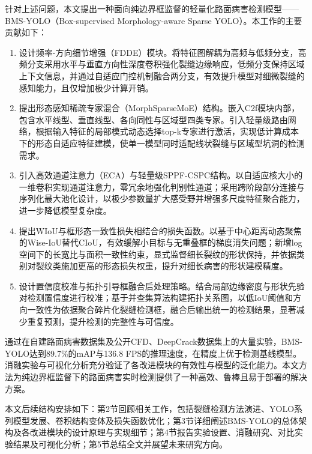 \documentclass[twocolumn]{sn-jnl}
\begin{document}
	针对上述问题，本文提出一种面向纯边界框监督的轻量化路面病害检测模型——BMS-YOLO（Box-supervised Morphology-aware Sparse YOLO）。本工作的主要贡献如下：

	\begin{enumerate}
		\item 设计频率-方向细节增强（FDDE）模块。将特征图解耦为高频与低频分支，高频分支采用水平与垂直方向性深度卷积强化裂缝边缘响应，低频分支保持区域上下文信息，并通过自适应门控机制融合两分支，有效提升模型对细微裂缝的感知能力，且仅增加极少计算开销。

		\item 提出形态感知稀疏专家混合（MorphSparseMoE）结构。嵌入C2f模块内部，包含水平线型、垂直线型、各向同性与区域型四类专家。引入轻量级路由网络，根据输入特征的局部模式动态选择top-k专家进行激活，实现低计算成本下的形态自适应特征建模，使单一模型同时适配线状裂缝与区域型坑洞的检测需求。

		\item 引入高效通道注意力（ECA）与轻量级SPPF-CSPC结构。以自适应核大小的一维卷积实现通道注意力，零冗余地强化判别性通道；采用跨阶段部分连接与序列化最大池化设计，以极少参数量扩大感受野并增强多尺度特征聚合能力，进一步降低模型复杂度。

		\item 提出WIoU与框形态一致性损失相结合的损失函数。以基于中心距离动态聚焦的Wise-IoU替代CIoU，有效缓解小目标与无重叠框的梯度消失问题；新增log空间下的长宽比与面积一致性约束，显式监督细长裂纹的形状保持，并依据类别对裂纹类施加更高的形态损失权重，提升对细长病害的形状建模精度。

		\item 设计置信度校准与拓扑引导框融合后处理策略。结合局部边缘密度与形状先验对检测置信度进行校准；基于并查集算法构建拓扑关系图，以低IoU阈值和方向一致性为依据聚合碎片化裂缝检测框，融合后输出统一的检测结果，显著减少重复预测，提升检测的完整性与可信度。
	\end{enumerate}

	通过在自建路面病害数据集及公开CFD、DeepCrack数据集上的大量实验，BMS-YOLO达到89.7\%的mAP与136.8 FPS的推理速度，在精度上优于检测基线模型。消融实验与可视化分析充分验证了各改进模块的有效性与模型的泛化能力。本文方法为纯边界框监督下的路面病害实时检测提供了一种高效、鲁棒且易于部署的解决方案。

	本文后续结构安排如下：第2节回顾相关工作，包括裂缝检测方法演进、YOLO系列模型发展、卷积结构变体及损失函数优化；第3节详细阐述BMS-YOLO的总体架构及各改进模块的设计原理与实现细节；第4节报告实验设置、消融研究、对比实验结果及可视化分析；第5节总结全文并展望未来研究方向。
	
\end{document}
